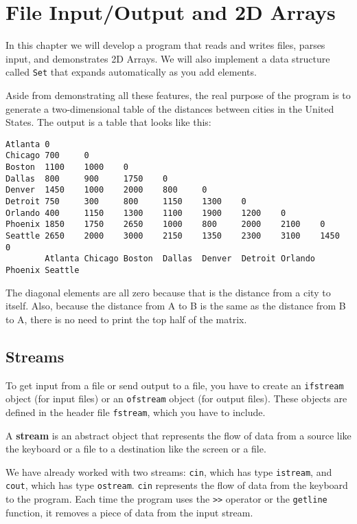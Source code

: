 

\chapter{File Input/Output and 2D Arrays}

In this chapter we will develop a program that reads and writes files,
parses input, and demonstrates 2D Arrays.  We will also
implement a data structure called {\tt Set} that expands automatically
as you add elements.

Aside from demonstrating all these features, the real purpose of the
program is to generate a two-dimensional table of
the distances between cities in the United States.
The output is a table that looks like this:

\begin{verbatim}
Atlanta 0
Chicago 700     0
Boston  1100    1000    0
Dallas  800     900     1750    0
Denver  1450    1000    2000    800     0
Detroit 750     300     800     1150    1300    0
Orlando 400     1150    1300    1100    1900    1200    0
Phoenix 1850    1750    2650    1000    800     2000    2100    0
Seattle 2650    2000    3000    2150    1350    2300    3100    1450    0
        Atlanta Chicago Boston  Dallas  Denver  Detroit Orlando Phoenix Seattle
\end{verbatim}
%
The diagonal elements are all zero because that is the distance
from a city to itself.  Also, because
the distance from A to B is the same as the distance from B
to A, there is no need to print the top half of the matrix.

\section {Streams}

To get input from a file or send output to a file, you have to
create an {\tt ifstream} object (for input files) or an
{\tt ofstream} object (for output files).  These objects
are defined in the header file {\tt fstream}, which you
have to include.


A {\bf stream} is an abstract object that represents the flow
of data from a source like the keyboard or a file to a destination
like the screen or a file.

We have already worked with two streams: {\tt cin}, which has type
{\tt istream}, and {\tt cout}, which has type {\tt ostream}.
{\tt cin} represents the flow of data from the keyboard to
the program.  Each time the program uses the {\tt >>} operator
or the {\tt getline} function, it removes a piece of data
from the input stream.

